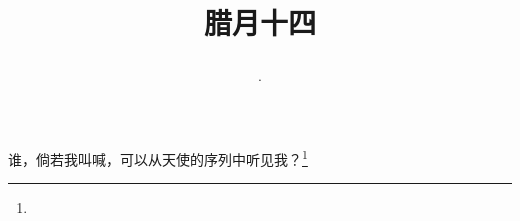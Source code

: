 \title{\date[d=24,m=1,y=2024][year:cn-y,年,month:cn,day:cn,日,·,weekday]·腊月十四 }
谁，倘若我叫喊，可以从天使的序列中听见我？\footnote{ }

